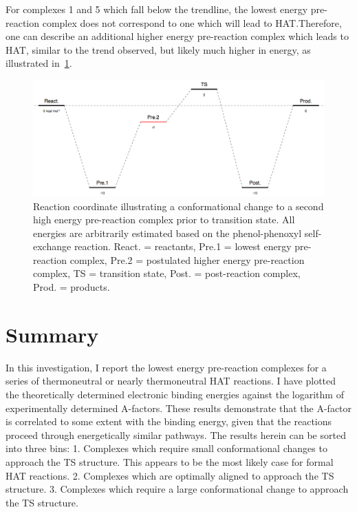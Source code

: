
For complexes 1 and 5 which fall below the trendline, the lowest energy pre-reaction complex does not correspond to one which will lead to HAT.\@ Therefore, one can describe an additional higher energy pre-reaction complex which leads to HAT, similar to the trend observed, but likely much higher in energy, as illustrated in~\ref{fig:afactor-low}.

\begin{figure}[htb]
  \centering
  \includegraphics[width=\textwidth]{figures/afactor-low.png}
  \caption[Reaction coordinate illustrating a conformational change to a second high energy pre-reaction complex prior to transition state.]{Reaction coordinate illustrating a conformational change to a second high energy pre-reaction complex prior to transition state. All energies are arbitrarily estimated based on the phenol-phenoxyl self-exchange reaction. React. = reactants, Pre.1 = lowest energy pre-reaction complex, Pre.2 = postulated higher energy pre-reaction complex, TS = transition state, Post. = post-reaction complex, Prod. = products.}
\label{fig:afactor-low}
\end{figure}

\section{Summary}

In this investigation, I report the lowest energy pre-reaction complexes for a series of thermoneutral or nearly thermoneutral HAT reactions. I have plotted the theoretically determined electronic binding energies against the logarithm of experimentally determined A-factors. These results demonstrate that the A-factor is correlated to some extent with the binding energy, given that the reactions proceed through energetically similar pathways. The results herein can be sorted into three bins: 1. Complexes which require small conformational changes to approach the TS structure. This appears to be the most likely case for formal HAT reactions. 2. Complexes which are optimally aligned to approach the TS structure. 3. Complexes which require a large conformational change to approach the TS structure.

